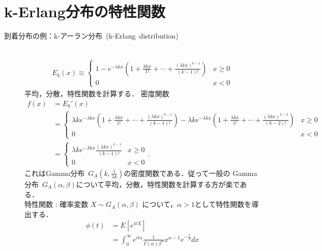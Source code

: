 \documentclass[a4j,papersize,disablejfam,slide,14pt]{jsarticle}
\def\exp#1{e^{#1}} %
\begin{document}
    

\section{{\rm k-Erlang}分布の特性関数}
\label{sec:appendix_erlang}
	\begin{description}
    	\item[到着分布の例：{\rm k-}アーラン分布\ {\rm (k-Erlang\ distribution)}]\mbox{}\\
    		\begin{align}
    			E_k(x) \equiv
        		\begin{cases}
        			1 - \exp{-\lambda k x} \left( 1 + \frac{\lambda k x}{1!} + \cdots + \frac{(\lambda k x)^{k-1}}{(k-1)!} \right) & \text{$x \geq 0$}\\
    				0 & \text{$x < 0$}
        		\end{cases}
    		\end{align}
        平均，分散，特性関数を計算する．
        密度関数
        \begin{align}
            f(x) &= E_k'(x) \\&= 
            \begin{cases}
        			\lambda k \exp{-\lambda k x} \left( 1 + \frac{\lambda k x}{1!} + \cdots + \frac{(\lambda k x)^{k-1}}{(k-1)!} \right)
                    - \lambda k \exp{-\lambda k x} \left( 1 + \frac{\lambda k x}{1!} + \cdots + \frac{(\lambda k x)^{k-2}}{(k-2)!} \right) & \text{$x \geq 0$}\\
    				0 & \text{$x < 0$}
        	\end{cases} 
            \\&=
            \begin{cases}
        			\lambda k \exp{-\lambda k x} \frac{(\lambda k x)^{k-1}}{(k-1)!} & \text{$x \geq 0$}\\
    				0 & \text{$x < 0$}
        	\end{cases}.
        \end{align}
        これは{\rm Gamma}分布\ $G_A(k, \frac{1}{\lambda k})$の密度関数である．従って一般の
        {\rm Gamma}分布\ $G_A(\alpha, \beta)$について平均，分散，特性関数を計算する方が楽である．\\
        特性関数 : 確率変数 $X \sim G_A(\alpha, \beta)$ について，$\alpha > 1$として特性関数を導出する．
        \begin{align}
			\phi(t) &= E[e^{itX}] \\
			&= \int_{0}^{\infty} e^{itx} \frac{1}{\Gamma(\alpha)\beta^\alpha} x^{\alpha-1} e^{-\frac{x}{\beta}} dx \\

\end{align}
\end{description}
\end{document}
